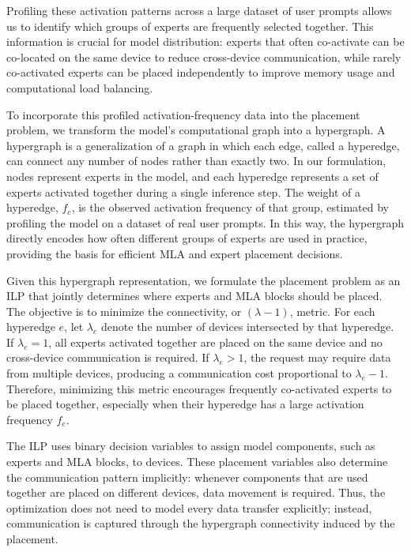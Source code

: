 \documentclass[oneside,reqno, a4paper]{amsart}
\numberwithin{equation}{section}
\begin{document}
Profiling these activation patterns across a large dataset of user prompts allows us to identify which groups of experts are frequently selected together. This information is crucial for model distribution: experts that often co-activate can be co-located on the same device to reduce cross-device communication, while rarely co-activated experts can be placed independently to improve memory usage and computational load balancing.

To incorporate this profiled activation-frequency data into the placement problem, we transform the model's computational graph into a hypergraph. A hypergraph is a generalization of a graph in which each edge, called a hyperedge, can connect any number of nodes rather than exactly two. In our formulation, nodes represent experts in the model, and each hyperedge represents a set of experts activated together during a single inference step. The weight of a hyperedge, $f_e$, is the observed activation frequency of that group, estimated by profiling the model on a dataset of real user prompts. In this way, the hypergraph directly encodes how often different groups of experts are used in practice, providing the basis for efficient MLA and expert placement decisions.

Given this hypergraph representation, we formulate the placement problem as an ILP that jointly determines where experts and MLA blocks should be placed. The objective is to minimize the connectivity, or $(\lambda - 1)$, metric. For each hyperedge $e$, let $\lambda_e$ denote the number of devices intersected by that hyperedge. If $\lambda_e = 1$, all experts activated together are placed on the same device and no cross-device communication is required. If $\lambda_e > 1$, the request may require data from multiple devices, producing a communication cost proportional to $\lambda_e - 1$. Therefore, minimizing this metric encourages frequently co-activated experts to be placed together, especially when their hyperedge has a large activation frequency $f_e$.

The ILP uses binary decision variables to assign model components, such as experts and MLA blocks, to devices. These placement variables also determine the communication pattern implicitly: whenever components that are used together are placed on different devices, data movement is required. Thus, the optimization does not need to model every data transfer explicitly; instead, communication is captured through the hypergraph connectivity induced by the placement.
\end{document}
